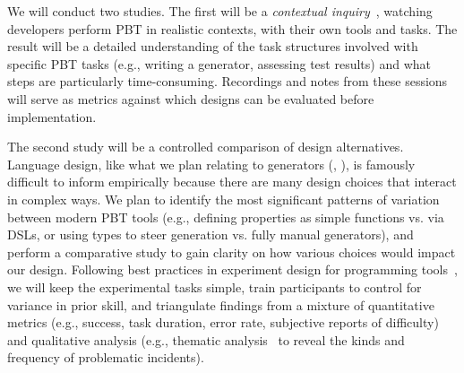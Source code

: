 We will conduct two studies. The first will be a
{\em contextual inquiry}~\cite[Chapter
3]{ref:holtzblatt1997contextual}, watching
developers perform PBT in realistic contexts, with their own tools and tasks.
The result will be a detailed understanding of the task
structures involved with specific PBT tasks (e.g., writing a generator,
assessing test results) and what steps are
particularly time-consuming.  Recordings and notes from
these sessions will serve as metrics against which designs
can be evaluated before implementation.

The second study will be a controlled comparison of design alternatives.
Language design, like what we plan relating to generators
(, ), is famously
difficult to inform empirically because there are many design choices
that interact in complex ways. We plan to identify the most
significant patterns of
variation between modern PBT tools (e.g., defining properties as simple
functions vs. via DSLs, or using types to steer
generation vs.{} fully manual generators), and perform a comparative
study to gain clarity on how various
choices would impact our design. Following best practices in experiment design
for programming tools~\cite{ref:ko2015practical}, we will keep the experimental tasks simple, train
participants to control for variance in prior skill, and triangulate findings
from a mixture of
quantitative metrics (e.g., success, task duration, error rate, subjective
reports of difficulty) and qualitative analysis (e.g., thematic
analysis~\cite{ref:blandford2016qualitative} to reveal the kinds and frequency
of problematic incidents).



